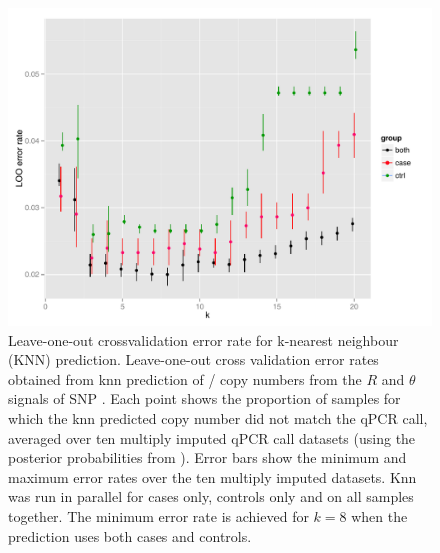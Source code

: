 \begin{figure}[h!]
  \centering
  \includegraphics[scale=.5]{KIR/figures/Figure-3.pdf}
  {Leave-one-out crossvalidation error rate for k-nearest neighbour (KNN) prediction.}
  {
  Leave-one-out cross validation error rates
  obtained from \gls{knn} prediction
  of / copy numbers from the $R$ and $\theta$ signals of SNP .
  Each point shows the proportion of samples for which the knn predicted copy number did not 
  match the qPCR call, averaged over ten multiply imputed qPCR call datasets
  (using the posterior probabilities from ). 
  Error bars show the minimum and maximum error rates over the ten multiply imputed datasets.
  Knn was run in parallel for cases only, controls only and on all samples together.
  The minimum error rate is achieved for $k=8$ when the prediction uses both cases and controls.}
\end{figure}

